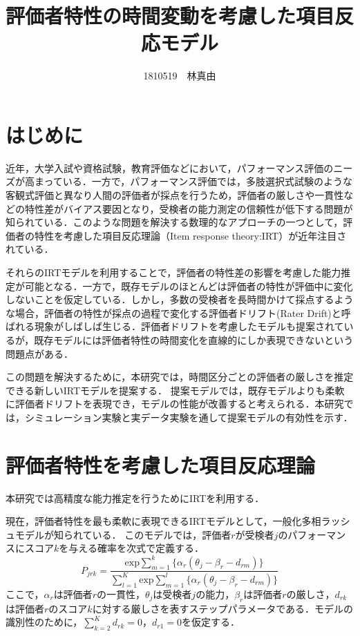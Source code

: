 \documentclass[dvipdfmx, twocolumn, a4paper]{hcresume}
\title{\bf 評価者特性の時間変動を考慮した項目反応モデル}
\author{1810519　林真由}
\begin{document}
\maketitle
\pagestyle{empty}
\thispagestyle{empty}
\section{はじめに}
近年，大学入試や資格試験，教育評価などにおいて，パフォーマンス評価のニーズが高まっている．一方で，パフォーマンス評価では，多肢選択式試験のような客観式評価と異なり人間の評価者が採点を行うため，評価者の厳しさや一貫性などの特性差がバイアス要因となり，受検者の能力測定の信頼性が低下する問題が知られている．このような問題を解決する数理的なアプローチの一つとして，評価者の特性を考慮した項目反応理論（Item response theory:IRT）\cite{IRTLord}が近年注目されている．

それらのIRTモデルを利用することで，評価者の特性差の影響を考慮した能力推定が可能となる．一方で，既存モデルのほとんどは評価者の特性が評価中に変化しないことを仮定している．しかし，多数の受検者を長時間かけて採点するような場合，評価者の特性が採点の過程で変化する評価者ドリフト(Rater Drift)と呼ばれる現象がしばしば生じる．評価者ドリフトを考慮したモデルも提案されているが，既存モデルには評価者特性の時間変化を直線的にしか表現できないという問題点がある．

この問題を解決するために，本研究では，時間区分ごとの評価者の厳しさを推定できる新しいIRTモデルを提案する．
提案モデルでは，既存モデルよりも柔軟に評価者ドリフトを表現でき，モデルの性能が改善すると考えられる．本研究では，シミュレーション実験と実データ実験を通して提案モデルの有効性を示す．

\section{評価者特性を考慮した項目反応理論}
本研究では高精度な能力推定を行うためにIRTを利用する．

現在，評価者特性を最も柔軟に表現できるIRTモデルとして，一般化多相ラッシュモデルが知られている\cite{g-MFRM}．
このモデルでは，評価者$r$が受検者$j$のパフォーマンスにスコア$k$を与える確率を次式で定義する．
\begin{equation}
  P_{jrk}=\frac{\mathrm{exp}\sum_{m=1}^{k}\{\alpha_r(\theta_{j}-\beta_{r}-d_{rm})\}}{\sum_{l=1}^{K}\mathrm{exp}\sum_{m=1}^{l}\{\alpha_r(\theta_{j}-\beta_{r}-d_{rm})\}}
\end{equation}
ここで，$\alpha_r$は評価者$r$の一貫性，$\theta_j$は受検者$j$の能力，$\beta_r$は評価者$r$の厳しさ，$d_{rk}$は評価者$r$のスコア$k$に対する厳しさを表すステップパラメータである．モデルの識別性のために，$\sum^{K}_{k=2}{d_{rk}}=0$，$d_{r1}=0$を仮定する．
\end{document}
